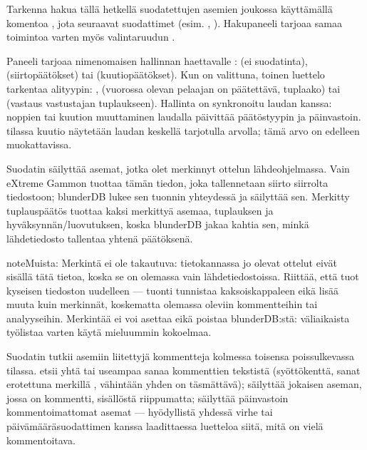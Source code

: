 \documentclass[letterpaper,10pt,finnish]{sphinxmanual}
\begin{document}
\sphinxAtStartPar
Tarkenna hakua tällä hetkellä suodatettujen asemien joukossa käyttämällä komentoa , jota seuraavat suodattimet (esim. , ). Hakupaneeli tarjoaa samaa toimintoa varten myös valintaruudun .

\sphinxAtStartPar
Paneeli tarjoaa nimenomaisen hallinnan haettavalle :  (ei suodatinta),  (siirtopäätökset) tai  (kuutiopäätökset). Kun  on valittuna, toinen luettelo tarkentaa alityypin: ,  (vuorossa olevan pelaajan on päätettävä, tuplaako) tai  (vastaus vastustajan tuplaukseen). Hallinta on synkronoitu laudan kanssa: noppien tai kuution muuttaminen laudalla päivittää päätöstyypin ja päinvastoin.  \sphinxhyphen{}tilassa kuutio näytetään laudan keskellä tarjotulla arvolla; tämä arvo on edelleen muokattavissa.

\sphinxAtStartPar
Suodatin  säilyttää asemat, jotka olet merkinnyt ottelun lähdeohjelmassa. Vain eXtreme Gammon tuottaa tämän tiedon, joka tallennetaan siirto siirrolta \sphinxhyphen{}tiedostoon; blunderDB lukee sen tuonnin yhteydessä ja säilyttää sen. Merkitty tuplauspäätös tuottaa kaksi merkittyä asemaa, tuplauksen ja hyväksynnän/luovutuksen, koska blunderDB jakaa kahtia sen, minkä lähdetiedosto tallentaa yhtenä päätöksenä.

\begin{sphinxadmonition}{note}{Muista:}
\sphinxAtStartPar
Merkintä ei ole takautuva: tietokannassa jo olevat ottelut eivät sisällä tätä tietoa, koska se on olemassa vain lähdetiedostoissa. Riittää, että tuot kyseisen \sphinxhyphen{}tiedoston uudelleen — tuonti tunnistaa kaksoiskappaleen eikä lisää muuta kuin merkinnät, koskematta olemassa oleviin kommentteihin tai analyyseihin. Merkintää ei voi asettaa eikä poistaa blunderDB:stä: väliaikaista työlistaa varten käytä mieluummin kokoelmaa.
\end{sphinxadmonition}

\sphinxAtStartPar
Suodatin  tutkii asemiin liitettyjä kommentteja kolmessa toisensa poissulkevassa tilassa.  etsii yhtä tai useampaa sanaa kommenttien tekstistä (syöttökenttä, sanat erotettuna merkillä \sphinxcode{\sphinxupquote{;}}, vähintään yhden on täsmättävä);  säilyttää jokaisen aseman, jossa on kommentti, sisällöstä riippumatta;  säilyttää päinvastoin kommentoimattomat asemat — hyödyllistä yhdessä virhe\sphinxhyphen{} tai päivämääräsuodattimen kanssa laadittaessa luetteloa siitä, mitä on vielä kommentoitava.
\end{document}
